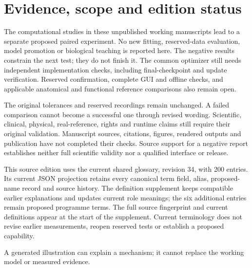 \section*{Evidence, scope and edition status}
The computational studies in these unpublished working manuscripts lead to a
separate proposed paired experiment. No new fitting, reserved-data evaluation,
model promotion or biological teaching is reported here. The negative results
constrain the next test; they do not finish it. The common optimizer still needs
independent implementation checks, including final-checkpoint and update
verification. Reserved confirmation, complete GUI and offline checks, and
applicable anatomical and functional reference comparisons also remain open.

The original tolerances and reserved recordings remain unchanged. A failed
comparison cannot become a successful one through revised wording. Scientific,
clinical, physical, real-reference, rights and runtime claims still require
their original validation. Manuscript sources, citations, figures, rendered
outputs and publication have not completed their checks. Source support for a
negative report establishes neither full scientific validity nor a qualified
interface or release.

This source edition uses the current shared glossary, revision 34, with 200 entries.
Its current JSON projection retains every canonical term field, alias, proposed-name record and source history.
The definition supplement keeps compatible earlier explanations and updates current role meanings; the six additional entries remain proposed programme terms.
The full source fingerprint and current definitions appear at the start of the supplement.
Current terminology does not revise earlier measurements, reopen reserved tests or establish a proposed capability.

A generated illustration can explain a mechanism; it cannot replace
the working model or measured evidence.

\ifdefined\RSevenSixFourTechnicalPackagingRecord
